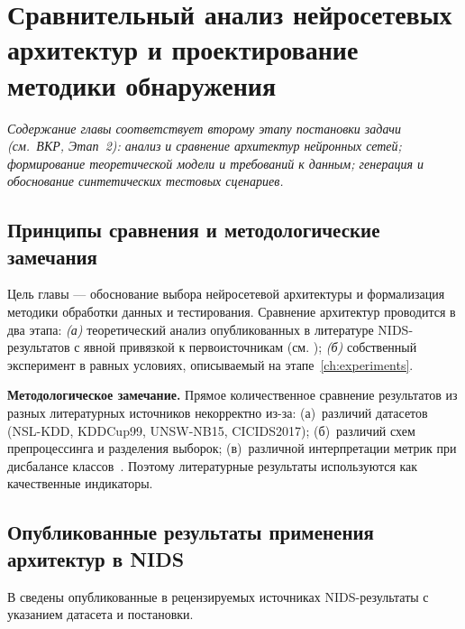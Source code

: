 \section{Сравнительный анализ нейросетевых архитектур и проектирование методики обнаружения}
\label{ch:design}

\noindent
\textit{Содержание главы соответствует второму этапу постановки
задачи (см.~ВКР, Этап~2): анализ и сравнение архитектур нейронных
сетей; формирование теоретической модели и требований к данным;
генерация и обоснование синтетических тестовых сценариев.}\\

\subsection{Принципы сравнения и методологические замечания}

Цель главы --- обоснование выбора нейросетевой архитектуры и
формализация методики обработки данных и тестирования.
Сравнение архитектур проводится в два этапа: \emph{(а)} теоретический
анализ опубликованных в литературе NIDS-результатов с явной привязкой
к первоисточникам (см. ); \emph{(б)}
собственный эксперимент в равных условиях, описываемый на
этапе~\ref{ch:experiments}.

\textbf{Методологическое замечание.} Прямое количественное сравнение
результатов из разных литературных источников некорректно из-за:
(а)~различий датасетов (NSL-KDD, KDDCup99, UNSW-NB15, CICIDS2017);
(б)~различий схем препроцессинга и разделения выборок;
(в)~различной интерпретации метрик при дисбалансе
классов~\cite{khraisat2019survey, sommer2010outside, pendlebury2019tesseract}.
Поэтому литературные результаты используются как качественные
индикаторы.

\subsection{Опубликованные результаты применения архитектур в NIDS}

В  сведены опубликованные в рецензируемых
источниках NIDS-результаты с указанием датасета и постановки.

